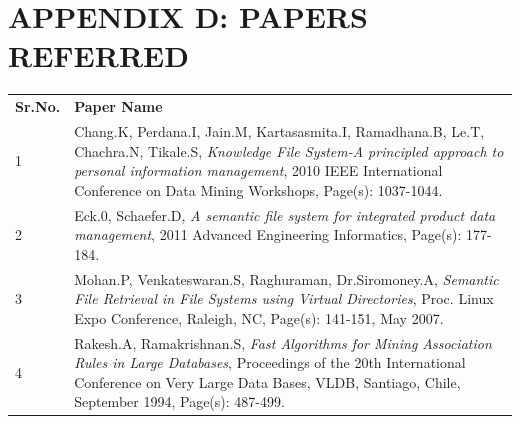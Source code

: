 \section{APPENDIX D: PAPERS REFERRED}

\begin{tabular}{p{1cm} p{12cm}}
\textbf{Sr.No.} & \textbf{Paper Name} \\
1 & Chang.K, Perdana.I, Jain.M, Kartasasmita.I, Ramadhana.B, Le.T, Chachra.N, Tikale.S, 
\emph{Knowledge File System-A principled approach to personal information management}, 2010 IEEE International Conference on Data Mining Workshops, Page(s): 1037-1044. \\
2 & Eck.0, Schaefer.D, \emph{A semantic file system for integrated product data management},
2011 Advanced Engineering Informatics, Page(s): 177-184.\\
3 & Mohan.P, Venkateswaran.S, Raghuraman, Dr.Siromoney.A, 
\emph{Semantic File Retrieval in File Systems using Virtual Directories},
Proc. Linux Expo Conference, Raleigh, NC, Page(s): 141-151, May 2007. \\
4 & Rakesh.A, Ramakrishnan.S, \emph{Fast Algorithms for Mining Association Rules in Large Databases},
Proceedings of the 20th International Conference on Very Large Data Bases, VLDB, Santiago, Chile, September 1994, Page(s): 487-499. \\
\end{tabular}

